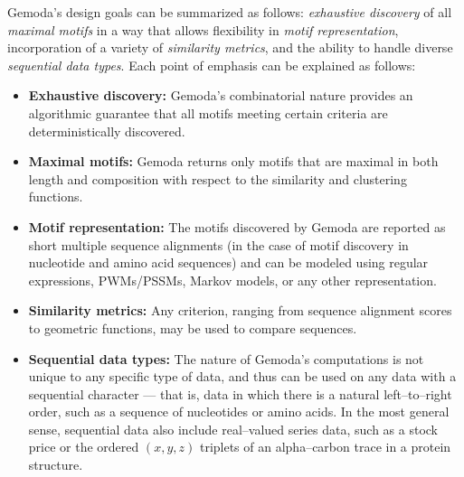     Gemoda's design goals can be summarized
    as follows: \emph{exhaustive discovery} of all
    \emph{maximal motifs} in a way that allows
    flexibility in \emph{motif representation},
    incorporation of a variety of
    \emph{similarity metrics}, and the ability to handle
    diverse \emph{sequential
    data types}.  Each point of emphasis can be explained
    as follows:
        \begin{itemize}

        \item\textbf{Exhaustive discovery:} Gemoda's combinatorial
            nature provides an algorithmic
            guarantee that all motifs meeting
            certain criteria are deterministically
            discovered.

        \item\textbf{Maximal motifs:} Gemoda
            returns only motifs that are maximal
            in both length and composition with respect
            to the similarity and clustering functions.


        \item\textbf{Motif representation:}  The motifs
            discovered by Gemoda are reported as
            short multiple
            sequence alignments (in the case of
            motif discovery in nucleotide and amino
            acid sequences) and can be
            modeled using regular expressions,
            PWMs/PSSMs, Markov models, or any
            other representation.

        \item\textbf{Similarity metrics:} Any criterion, ranging
            from sequence alignment scores to
            geometric functions, may be used to
            compare sequences.

        \item\textbf{Sequential data types:} The
            nature of Gemoda's computations is not
            unique to any specific type of data,
            and thus can be used on any data with
            a sequential character --- that is,
            data in which there is a natural
            left--to--right order, such as a
            sequence of nucleotides or amino acids.
            In the most general sense, sequential data
            also include real--valued series data,
            such as a stock price or the ordered
            $(x,y,z)$ triplets of an alpha--carbon
            trace in a protein structure.



        \end{itemize}

